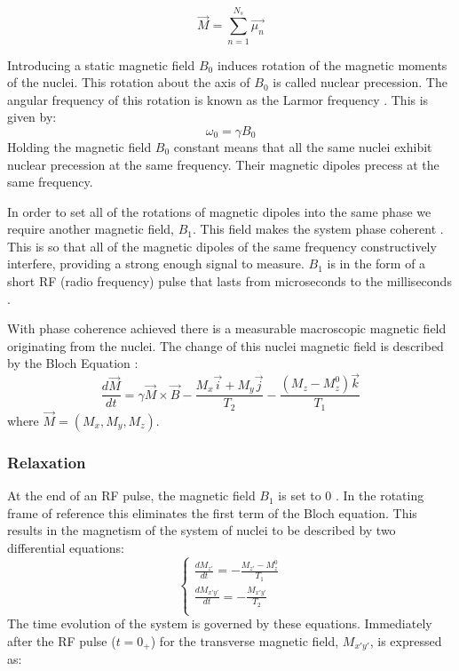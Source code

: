 \begin{equation}
    \vec{M} = \sum^{N_s}_{n = 1}\vec{\mu_{n}}
    \label{eq:macroMagnetic}
\end{equation}

Introducing a static magnetic field $B_0$ induces rotation of the magnetic moments of the nuclei. This rotation about the axis of $B_0$ is called nuclear precession. The angular frequency of this rotation is known as the Larmor frequency  \cite{NMRSignalProcessingBook}. This is given by: 
\begin{equation}
    \omega_0 = \gamma B_0
    \label{ref:LarmorFreq}
\end{equation}
Holding the magnetic field $B_0$ constant means that all the same nuclei exhibit nuclear precession at the same frequency. Their magnetic dipoles precess at the same frequency.

In order to set all of the rotations of magnetic dipoles into the same phase we require another magnetic field, $B_1$. This field makes the system phase coherent  \cite{NMRSignalProcessingBook}. This is so that all of the magnetic dipoles of the same frequency constructively interfere, providing a strong enough signal to measure. $B_1$ is in the form of a short RF (radio frequency) pulse that lasts from microseconds to the milliseconds  \cite{NMRSignalProcessingBook}.

With phase coherence achieved there is a measurable macroscopic magnetic field originating from the nuclei. The change of this nuclei magnetic field is described by the Bloch Equation  \cite{NMRSignalProcessingBook}:
\begin{equation}
    \frac{d\vec{M}}{dt} = \gamma \vec{M} \times \vec{B} - \frac{M_{x}\vec{i} + M_{y}\vec{j}}{T_2} - \frac{(M_z - M_{z}^0)\vec{k}}{T_1}
    \label{eq:blochEquation}
\end{equation}
where $\vec{M} = (M_x, M_y, M_z)$.
\subsubsection{Relaxation}

At the end of an RF pulse, the magnetic field $B_1$ is set to 0  \cite{NMRSignalProcessingBook}. In the rotating frame of reference this eliminates the first term of the Bloch equation. This results in the magnetism of the system of nuclei to be described by two differential equations:
\begin{equation}
    \begin{cases}
          \frac{dM_{z'}}{dt}    =         -\frac{M_{z'} - M_{z}^0}{T_1}  \\
           \frac{dM_{x'y'}}{dt}    =         -\frac{M_{x'y'}}{T_2}  \\         
    \end{cases}
\end{equation}
The time evolution of the system is governed by these equations. Immediately after the RF pulse ($t = 0_+$) for the transverse magnetic field, $M_{x'y'}$, is expressed as:

